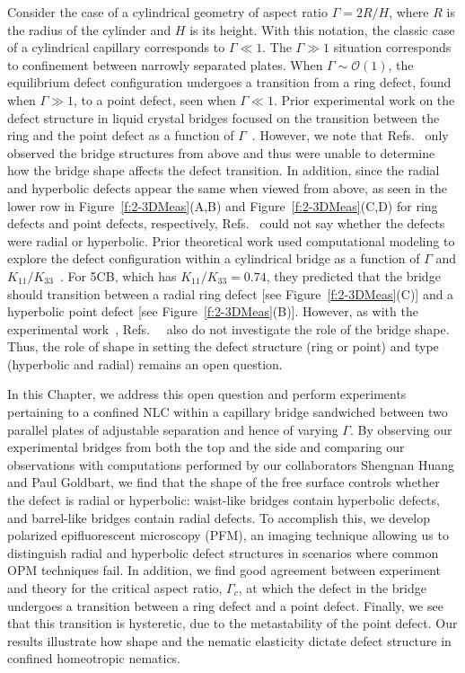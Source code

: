 Consider the case of a cylindrical geometry of aspect ratio $\Gamma = 2 R/H$, where $R$ is the radius of the cylinder and $H$ is its height.
With this notation, the classic case of a cylindrical capillary corresponds to $\Gamma \ll 1$. The $\Gamma \gg 1$ situation corresponds to confinement between narrowly separated plates.
When $\Gamma \sim \mathcal{O}\left( 1 \right)$, the equilibrium defect configuration undergoes a transition from a ring defect, found when $\Gamma \gg 1$, to a point defect, seen when $\Gamma \ll 1$.
Prior experimental work on the defect structure in liquid crystal bridges focused on the transition between the ring and the point defect as a function of $\Gamma$~\cite{RN139,RN147}.
However, we note that Refs.~\cite{RN139,RN147} only observed the bridge structures from above and thus were unable to determine how the bridge shape affects the defect transition.
In addition, since the radial and hyperbolic defects appear the same when viewed from above, as seen in the lower row in Figure~\ref{f:2-3DMeas}(A,B) and Figure~\ref{f:2-3DMeas}(C,D) for ring defects and point defects, respectively, Refs.~\cite{RN139,RN147} could not say whether the defects were radial or hyperbolic.
Prior theoretical work used computational modeling to explore the defect configuration within a cylindrical bridge as a function of $\Gamma$ and $K_{11}/K_{33}$~\cite{RN138,RN144}.
For 5CB, which has $K_{11}/K_{33} = 0.74$, they predicted that the bridge should transition between a radial ring defect [see Figure~\ref{f:2-3DMeas}(C)] and a hyperbolic point defect [see Figure~\ref{f:2-3DMeas}(B)].
However, as with the experimental work~\cite{RN139,RN147}, Refs.~~\cite{RN138,RN144} also do not investigate the role of the bridge shape.
Thus, the role of shape in setting the defect structure (ring or point) and type (hyperbolic and radial) remains an open question.

In this Chapter, we address this open question and perform experiments pertaining to a confined NLC within a capillary bridge sandwiched between two parallel plates of adjustable separation and hence of varying $\Gamma$.
By observing our experimental bridges from both the top and the side and comparing our observations with computations performed by our collaborators Shengnan Huang and Paul Goldbart, we find that the shape of the free surface controls whether the defect is radial or hyperbolic: waist-like bridges contain hyperbolic defects, and barrel-like bridges contain radial defects.
To accomplish this, we develop polarized epifluorescent microscopy (PFM), an imaging technique allowing us to distinguish radial and hyperbolic defect structures in scenarios where common OPM techniques fail.
In addition, we find good agreement between experiment and theory for the critical aspect ratio, $\Gamma_c$, at which the defect in the bridge undergoes a transition between a ring defect and a point defect.
Finally, we see that this transition is hysteretic, due to the metastability of the point defect.
Our results illustrate how shape and the nematic elasticity dictate defect structure in confined homeotropic nematics.




